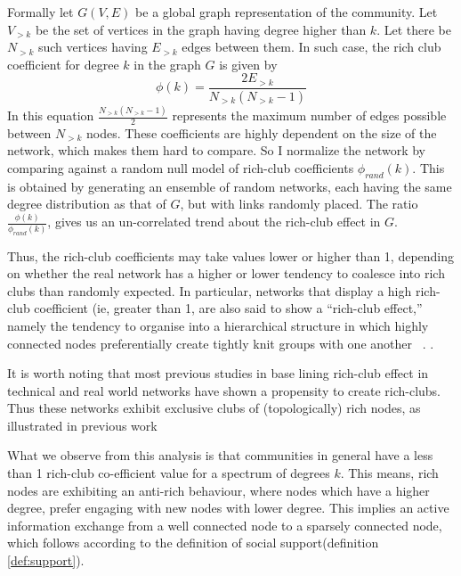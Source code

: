Formally let $G(V,E)$ be a global graph representation of the community. Let $V_{>k}$ be the set of vertices in the graph having degree higher than $k$. Let there be $N_{>k}$ such vertices having $E_{>k}$ edges between them. In such case, the rich club coefficient for degree $k$ in the graph $G$ is given by 
\begin{equation}
 \phi(k) = \frac{2E_{>k}}{N_{>k}(N_{>k} - 1)}
 \label{eq:rich_club}
\end{equation}
In this equation $\frac{N_{>k}(N_{>k} - 1)}{2}$ represents the maximum number of edges possible between $N_{>k}$ nodes. These coefficients are highly dependent on the size of the network, which makes them hard to compare. So I normalize the network by comparing against a random null model of rich-club coefficients $\phi_{rand}(k)$. This is obtained by generating an ensemble of random networks, each having the same degree distribution as that of $G$, but with links randomly placed. The ratio $\frac{\phi(k)}{\phi_{rand}(k)}$, gives us an un-correlated trend about the rich-club effect in $G$. 

Thus, the rich-club coefficients may take values lower or higher than 1, depending on whether the real network has a higher or lower tendency to coalesce into rich clubs than randomly expected. In particular, networks that display a high rich-club coefficient (ie, greater than 1, are also said to show a “rich-club effect,” namely the tendency to organise into a hierarchical structure in which highly connected nodes preferentially create tightly knit groups with one another ~\cite{mcauley2007rich}. .

\begin{remark}
    It is worth noting that most previous studies in base lining rich-club effect in technical and real world networks have shown a propensity to create rich-clubs. Thus these networks exhibit exclusive clubs of (topologically) rich nodes, as illustrated in previous work~\cite{zhou2004rich,colizza2006detecting}
\end{remark}
What we observe from this analysis is that communities in general have a less than 1 rich-club co-efficient value for a spectrum of degrees $k$. This means, rich nodes are exhibiting an anti-rich behaviour, where nodes which have a higher degree, prefer engaging with new nodes with lower degree. This implies an active information exchange from a well connected node to a sparsely connected node, which follows according to the definition of social support(definition \ref{def:support}).


